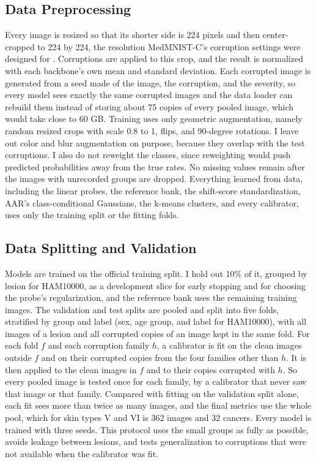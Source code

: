 \documentclass[sigconf,nonacm]{acmart}
\begin{document}
\subsection{Data Preprocessing}

Every image is resized so that its shorter side is 224 pixels and then center-cropped to 224 by 224, the resolution MedMNIST-C's corruption settings were designed for \cite{disalvo2024medmnistc}. Corruptions are applied to this crop, and the result is normalized with each backbone's own mean and standard deviation. Each corrupted image is generated from a seed made of the image, the corruption, and the severity, so every model sees exactly the same corrupted images and the data loader can rebuild them instead of storing about 75 copies of every pooled image, which would take close to 60 GB. Training uses only geometric augmentation, namely random resized crops with scale 0.8 to 1, flips, and 90-degree rotations. I leave out color and blur augmentation on purpose, because they overlap with the test corruptions. I also do not reweight the classes, since reweighting would push predicted probabilities away from the true rates. No missing values remain after the images with unrecorded groups are dropped. Everything learned from data, including the linear probes, the reference bank, the shift-score standardization, AAR's class-conditional Gaussians, the k-means clusters, and every calibrator, uses only the training split or the fitting folds.

\subsection{Data Splitting and Validation}
\label{sec:splits}

Models are trained on the official training split. I hold out 10\% of it, grouped by lesion for HAM10000, as a development slice for early stopping and for choosing the probe's regularization, and the reference bank uses the remaining training images. The validation and test splits are pooled and split into five folds, stratified by group and label (sex, age group, and label for HAM10000), with all images of a lesion and all corrupted copies of an image kept in the same fold. For each fold $f$ and each corruption family $h$, a calibrator is fit on the clean images outside $f$ and on their corrupted copies from the four families other than $h$. It is then applied to the clean images in $f$ and to their copies corrupted with $h$. So every pooled image is tested once for each family, by a calibrator that never saw that image or that family. Compared with fitting on the validation split alone, each fit sees more than twice as many images, and the final metrics use the whole pool, which for skin types V and VI is 362 images and 32 cancers. Every model is trained with three seeds. This protocol uses the small groups as fully as possible, avoids leakage between lesions, and tests generalization to corruptions that were not available when the calibrator was fit.
\end{document}
